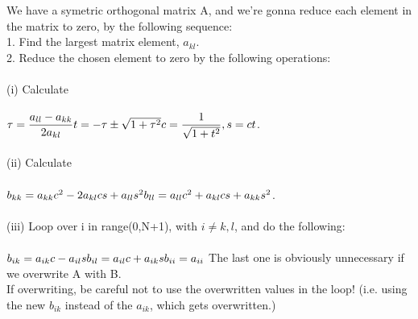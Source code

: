 \documentclass[12pt,a4paper]{article}
\begin{document}
We have a symetric orthogonal matrix A, and we're gonna reduce each element in the matrix to zero, by the following sequence:\\
1. Find the largest matrix element, $a_{kl}$.\\
2. Reduce the chosen element to zero by the following operations:\\
\\
(i) Calculate\\
\\
$\tau = \dfrac{a_{ll}-a_{kk}}{2a_{kl}}\\
\\
t = -\tau \pm \sqrt{1+\tau^2}\\
\\
c = \dfrac{1}{\sqrt{1+t^2}}, s = ct$.\\
\\
(ii) Calculate\\
\\
$b_{kk} = a_{kk}c^2 - 2a_{kl}cs + a_{ll}s^2\\
\\
b_{ll} = a_{ll}c^2 + a_{kl}cs + a_{kk}s^2$.\\
\\
(iii) Loop over i in range(0,N+1), with $i \neq k,l$, and do the following:\\
\\
$b_{ik} = a_{ik}c - a_{il}s\\
\\
b_{il} = a_{il}c + a_{ik}s\\
\\
b_{ii} = a_{ii}\\
\\
$
The last one is obviously unnecessary if we overwrite A with B.\\
If overwriting, be careful not to use the overwritten values in the loop! (i.e. using the new $b_{ik}$ instead of the $a_{ik}$, which gets overwritten.)
\end{document}
